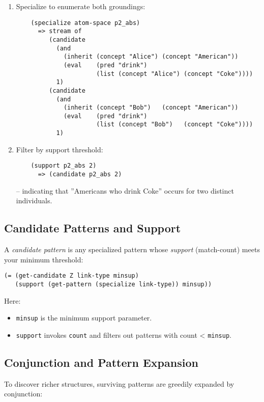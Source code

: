 \begin{enumerate}
\item  Specialize to enumerate both groundings:
    \begin{verbatim}
    (specialize atom-space p2_abs)
      => stream of
         (candidate
           (and
             (inherit (concept "Alice") (concept "American"))
             (eval    (pred "drink")
                      (list (concept "Alice") (concept "Coke"))))
           1)
         (candidate
           (and
             (inherit (concept "Bob")   (concept "American"))
             (eval    (pred "drink")
                      (list (concept "Bob")   (concept "Coke"))))
           1)
    \end{verbatim}

\item  Filter by support threshold:
    \begin{verbatim}
    (support p2_abs 2)
      => (candidate p2_abs 2)
    \end{verbatim}
  -- indicating that ''Americans who drink Coke'' occurs for two distinct individuals.

\end{enumerate}

\subsection{Candidate Patterns and Support}

A \emph{candidate pattern} is any specialized pattern whose \emph{support} (match-count) meets your minimum threshold:

\begin{verbatim}
(= (get-candidate Z link-type minsup)
   (support (get-pattern (specialize link-type)) minsup))
\end{verbatim}

Here:
\begin{itemize}
  \item \texttt{minsup} is the minimum support parameter.
  \item \texttt{support} invokes \texttt{count} and filters out patterns with count < \texttt{minsup}.
\end{itemize}

\subsection{Conjunction and Pattern Expansion}

To discover richer structures, surviving patterns are greedily expanded by conjunction:

